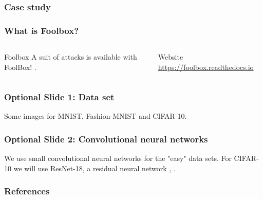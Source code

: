\documentclass[10pt,usepdftitle=false,aspectratio=169]{beamer}
\begin{document}
\begin{frame}[fragile]
	\frametitle{Case study}
	
\end{frame}

\begin{frame}[fragile]
	\frametitle{What is Foolbox?}
	\begin{columns}
		\begin{column}{.45\columnwidth}
			\begin{block}{Foolbox}
				A suit of attacks is available with FoolBox! \cite{rauber2017foolbox}.
			\end{block}
		\end{column}
		\begin{column}{.55\columnwidth}
			\begin{alertblock}{Website}
				\url{https://foolbox.readthedocs.io}
			\end{alertblock}
		\end{column}
	\end{columns}
\end{frame}

\begin{frame}[fragile]
	\frametitle{Optional Slide 1: Data set}
	Some images for MNIST, Fashion-MNIST and CIFAR-10.
\end{frame}

\begin{frame}[fragile]
	\frametitle{Optional Slide 2: Convolutional neural networks}
	We use small convolutional neural networks \cite{lecun1999object} for the "easy" data sets. For CIFAR-10 we will use ResNet-18, a residual neural network \cite{he2016deep}, \cite{he2016identity}.
\end{frame}

\begin{frame}[allowframebreaks]
	\frametitle{References}
	
	
\end{frame}
\end{document}
